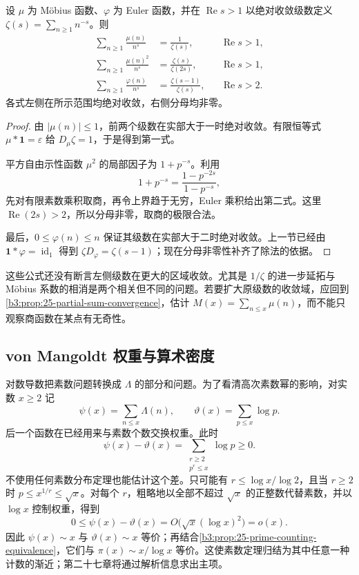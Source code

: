 \begin{proposition}[三个算术级数的商表示]\label{b3:prop:25-basic-quotients}
设 \(\mu\) 为 Möbius 函数、\(\varphi\) 为 Euler 函数，并在 \(\operatorname{Re}s>1\) 以绝对收敛级数定义 \(\zeta(s)=\sum_{n\ge1}n^{-s}\)。则
\begin{align}
 \sum_{n\ge1}\frac{\mu(n)}{n^s}
 &=\frac1{\zeta(s)},&&\operatorname{Re}s>1,
 \label{b3:eq:25-mobius-series}\\
 \sum_{n\ge1}\frac{\mu(n)^2}{n^s}
 &=\frac{\zeta(s)}{\zeta(2s)},&&\operatorname{Re}s>1,
 \label{b3:eq:25-squarefree-series}\\
 \sum_{n\ge1}\frac{\varphi(n)}{n^s}
 &=\frac{\zeta(s-1)}{\zeta(s)},&&\operatorname{Re}s>2.
 \label{b3:eq:25-totient-series}
\end{align}
各式左侧在所示范围均绝对收敛，右侧分母均非零。
\end{proposition}
\begin{proof}
由 \(|\mu(n)|\le1\)，前两个级数在实部大于一时绝对收敛。有限恒等式 \(\mu*\mathbf1=\varepsilon\) 给 \(D_\mu\zeta=1\)，于是得到第一式。

平方自由示性函数 \(\mu^2\) 的局部因子为 \(1+p^{-s}\)。利用
\[
 1+p^{-s}=\frac{1-p^{-2s}}{1-p^{-s}},
\]
先对有限素数乘积取商，再令上界趋于无穷，Euler 乘积给出第二式。这里 \(\operatorname{Re}(2s)>2\)，所以分母非零，取商的极限合法。

最后，\(0\le\varphi(n)\le n\) 保证其级数在实部大于二时绝对收敛。上一节已经由 \(\mathbf1*\varphi=\operatorname{id}_1\) 得到 \(\zeta D_\varphi=\zeta(s-1)\)；现在分母非零性补齐了除法的依据。
\end{proof}

这些公式还没有断言左侧级数在更大的区域收敛。尤其是 \(1/\zeta\) 的进一步延拓与 Möbius 系数的相消是两个相关但不同的问题。若要扩大原级数的收敛域，应回到\cref{b3:prop:25-partial-sum-convergence}，估计 \(M(x)=\sum_{n\le x}\mu(n)\)，而不能只观察商函数在某点有无奇性。

\subsection{von Mangoldt 权重与算术密度}
\label{b3:subsec:250505}

对数导数把素数问题转换成 \(\Lambda\) 的部分和问题。为了看清高次素数幂的影响，对实数 \(x\ge2\) 记
\[
 \psi(x)=\sum_{n\le x}\Lambda(n),\qquad
 \vartheta(x)=\sum_{p\le x}\log p.
\]
后一个函数在已经用来与素数个数交换权重。此时
\[
 \psi(x)-\vartheta(x)
 =\sum_{\substack{r\ge2\\p^r\le x}}\log p\ge0.
\]
不使用任何素数分布定理也能估计这个差。只可能有 \(r\le\log x/\log2\)，且当 \(r\ge2\) 时 \(p\le x^{1/r}\le\sqrt x\)。对每个 \(r\)，粗略地以全部不超过 \(\sqrt x\) 的正整数代替素数，并以 \(\log x\) 控制权重，得到
\[
 0\le\psi(x)-\vartheta(x)
 =O\bigl(\sqrt x(\log x)^2\bigr)=o(x).
\]
因此 \(\psi(x)\sim x\) 与 \(\vartheta(x)\sim x\) 等价；再结合\cref{b3:prop:25-prime-counting-equivalence}，它们与 \(\pi(x)\sim x/\log x\) 等价。这使素数定理归结为其中任意一种计数的渐近；第二十七章将通过解析信息求出主项。

